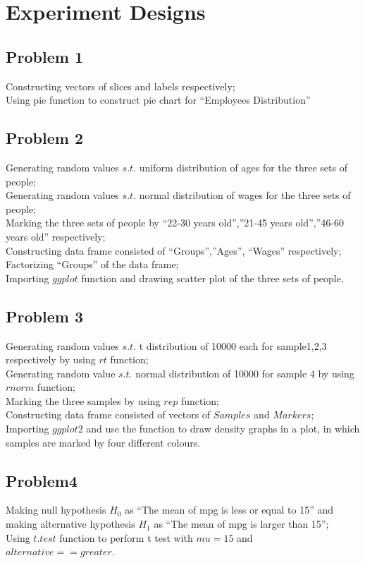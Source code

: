 \documentclass[12pt]{article}
\begin{document}
\section{Experiment Designs}

\subsection*{Problem 1} 
Constructing vectors of slices and labels respectively;\\
Using pie function to construct pie chart for “Employees Distribution” \\
\subsection*{Problem 2} 
Generating random values $s.t.$ uniform distribution of ages for the three sets of people; \\
Generating random values $s.t.$ normal distribution of wages for the three sets of people; \\
Marking the three sets of people by “22-30 years old”,”21-45 years old”,”46-60 years old” respectively; \\ 
Constructing data frame consisted of “Groups”,”Ages”, “Wages” respectively; \\
Factorizing “Groups” of the data frame;\\
Importing $ggplot$ function and drawing scatter plot of the three sets of people.\\   
\subsection*{Problem 3} 
  Generating random values $s.t.$ t distribution of 10000 each for sample1,2,3 respectively by using $rt$ function;\\ Generating random value $s.t.$ normal distribution of 10000 for sample 4 by using $rnorm$ function;\\ Marking the three samples by using  $rep$ function;\\ Constructing data frame consisted of vectors of $Samples$ and $Markers$;\\ Importing $ggplot2$ and use the function to draw density graphs in a plot, in which samples are marked by four different colours.\\
\subsection*{Problem4} 
Making null hypothesis $H_{0}$ as “The mean of mpg is less or equal to 15” and making alternative hypothesis $H_{1}$ as “The mean of mpg is larger than 15”; \\ Using $t.test$ function to perform t test with $mu = 15$ and $alternative == greater$.\\
\end{document}

